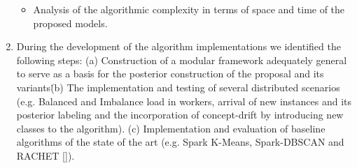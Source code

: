 \documentclass[10pt]{article}
\begin{document}
\begin{enumerate}
\begin{itemize}
\item Analysis of the algorithmic complexity in terms of space and time of the proposed models.
\end{itemize}
\item During the development of the algorithm implementations we identified the following steps: (a) Construction of a modular framework adequately general to serve as a basis for the posterior construction of the proposal and its variants\. (b) The implementation and testing of several distributed scenarios (e.g. Balanced and Imbalance load in workers, arrival of new instances and its posterior labeling and the incorporation of concept-drift by introducing new classes to the algorithm).
(c) Implementation and evaluation of baseline algorithms of the state of the art (e.g. Spark K-Means, Spark-DBSCAN and RACHET [\citep{SOGM02}]).%


\end{enumerate}
\end{document}
